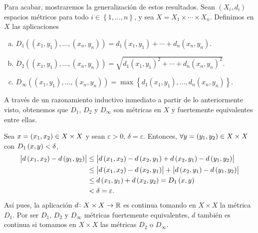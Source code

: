\begin{eje}
    Para acabar, mostraremos la generalización de estos resultados. Sean $\left( X_i, d_i \right)$ espacios métricos para todo $i \in \left\{1, \dots , n \right\}$, y sea $X=X_1 \times \cdots \times X_n$. Definimos en $X$ las aplicaciones
    \begin{enumerate}[(a)]
        \item $D_1\left( \left( x_1, y_1 \right), \dots , \left( x_n, y_n \right) \right) = d_1\left( x_1, y_1 \right) + \cdots + d_n \left( x_n, y_n \right).$
        \item $D_2\left( \left( x_1, y_1 \right), \dots , \left( x_n, y_n \right) \right) = \sqrt{d_1\left( x_1, y_1 \right)^2 + \cdots + d_n \left( x_n, y_n \right)^2}.$
        \item $D_{\infty}\left( \left( x_1, y_1 \right), \dots , \left( x_n, y_n \right) \right) = \max \left\{d_1\left( x_1, y_1 \right), \dots, d_n \left( x_n, y_n \right) \right\}.$
    \end{enumerate}
    A través de un razonamiento inductivo inmediato a partir de lo anteriormente visto, obtenemos que $D_1$, $D_2$ y $D_{\infty}$ son métricas en $X$ y fuertemente equivalentes entre ellas.
\end{eje}

\begin{eje}
    Sea $x= \left( x_1, x_2 \right) \in X \times X$ y sean $\varepsilon > 0, \, \delta=\varepsilon$. Entonces, $\forall y = \left( y_1, y_2 \right) \in X \times X$ con $D_1 \left( x, y \right) < \delta$,
    \begin{align*}
        \left| d\left( x_1, x_2 \right) - d\left( y_1, y_2 \right) \right| &\leq \left| d\left( x_1, x_2 \right) -d\left( x_2, y_1 \right) + d \left( x_2, y_1 \right) - d\left( y_1, y_2 \right) \right| \\
        &\leq \left| d\left( x_1, x_2 \right) -d\left( x_2, y_1 \right) \right| + \left| d \left( x_2, y_1 \right) - d\left( y_1, y_2 \right) \right| \\
        &\leq d\left( x_1, y_1 \right) + d\left( x_2, y_2 \right) = D_1 \left( x, y \right) \\
        &< \delta = \varepsilon.
    \end{align*}
    Así pues, la aplicación $d \colon X \times X \to \mathbb{R}$ es continua tomando en $X \times X$ la métrica $D_1$. Por ser $D_1$, $D_2$ y $D_{\infty}$ métricas fuertemente equivalentes, $d$ también es continua si tomamos en $X \times X$ las métricas $D_2$ o $D_{\infty}$.
\end{eje}

